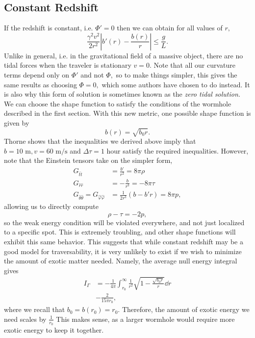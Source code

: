 \documentclass[%
 reprint,
 amsmath,amssymb
 aps,
]{revtex4}
\theoremstyle{remark}
\begin{document}
\subsection{Constant Redshift}
If the redshift is constant, i.e. $\Phi'=0$ then we can obtain for all values of $r,$
\begin{equation}
    \frac{\gamma^2v^2}{2r^2}\left|b'(r)-\frac{b(r)}{r}\right| \le \frac{g}{L}.
\end{equation} 
Unlike in general, i.e. in the gravitational field of a massive object, there are no tidal forces when the traveler is stationary $v=0.$ Note that all our curvature terms depend only on $\Phi'$ and not $\Phi,$ so to make things simpler, this gives the same results as choosing $\Phi=0,$ which some authors have chosen to do instead\cite{Lobo}. It is also why this form of solution is sometimes known as the \textit{zero tidal solution.} We can choose the shape function to satisfy the conditions of the wormhole described in the first section. With this new metric, one possible shape function is given by
\begin{equation}
    b(r) = \sqrt{b_0r}.
\end{equation}
Thorne shows that the inequalities we derived above imply that $b=10\text{ m},v = 60\text{ m/s}$ and $\Delta \tau = 1 \text{ hour}$ satisfy the required inequalities\cite{Thorne}. However, note that the Einstein tensors take on the simpler form,
\begin{align}
    G_{\hat{t}\hat{t}} &= \frac{b'}{r^2} = 8\pi \rho \\ 
    G_{\hat{r}\hat{r}} &= -\frac{b}{r^3} = -8\pi \tau \\ 
    G_{\hat{\theta}\hat{\theta}} = G_{\hat{\varphi}\hat{\varphi}} &= \frac{1}{2r^3}(b-b'r) = 8\pi p,
\end{align}
allowing us to directly compute
\begin{equation}
    \rho - \tau = -2p,
\end{equation}
so the weak energy condition will be violated everywhere, and not just localized to a specific spot\cite{Visser}. This is extremely troubling, and other shape functions will exhibit this same behavior. This suggests that while constant redshift may be a good model for traversability, it is very unlikely to exist if we wish to minimize the amount of exotic matter needed. Namely, the average null energy integral gives 
\begin{align}
    I_{\Gamma} &= -\frac{1}{4\pi} \int_{r_0}^{\infty} \frac{1}{r^2}\sqrt{1-\frac{\sqrt{b_0r}}{r}}\dd{r} \\ 
    & -\frac{2}{15\pi r_0},
\end{align}
where we recall that $b_0=b(r_0)=r_0.$ Therefore, the amount of exotic energy we need scales by $\frac{1}{r_0}$ This makes sense, as a larger wormhole would require more exotic energy to keep it together.
\end{document}

